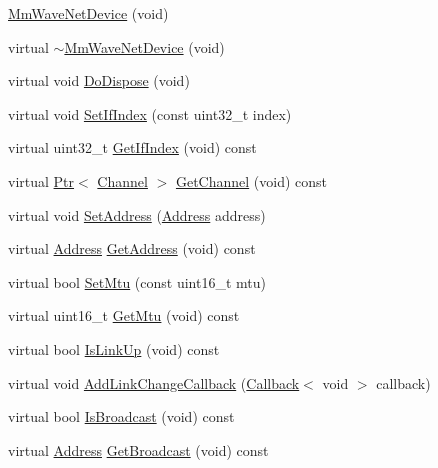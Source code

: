 \begin{DoxyCompactItemize}
\item 
\hyperlink{classns3_1_1MmWaveNetDevice_a554655d89a70a36abe6cf2cb6e44f5ce}{Mm\+Wave\+Net\+Device} (void)
\item 
virtual \hyperlink{classns3_1_1MmWaveNetDevice_a6e6a24b9b76bbb82cbf695832054f9a8}{$\sim$\+Mm\+Wave\+Net\+Device} (void)
\item 
virtual void \hyperlink{classns3_1_1MmWaveNetDevice_aabc1cc2924b3da99b6e0659ca55ae5ae}{Do\+Dispose} (void)
\item 
virtual void \hyperlink{classns3_1_1MmWaveNetDevice_a49dc45a2cf9dae3d8f32a57c1e3c4cec}{Set\+If\+Index} (const uint32\+\_\+t index)
\item 
virtual uint32\+\_\+t \hyperlink{classns3_1_1MmWaveNetDevice_af0dcd5b0dc0c6463a7f67c40cebdb30c}{Get\+If\+Index} (void) const 
\item 
virtual \hyperlink{classns3_1_1Ptr}{Ptr}$<$ \hyperlink{classns3_1_1Channel}{Channel} $>$ \hyperlink{classns3_1_1MmWaveNetDevice_a0a094fe438099aeb2f8ec46b9dabd98a}{Get\+Channel} (void) const 
\item 
virtual void \hyperlink{classns3_1_1MmWaveNetDevice_aa427e371add947c8459dacd620170062}{Set\+Address} (\hyperlink{classns3_1_1Address}{Address} address)
\item 
virtual \hyperlink{classns3_1_1Address}{Address} \hyperlink{classns3_1_1MmWaveNetDevice_a7b11eb72017ac4243c33a11ea6f60cad}{Get\+Address} (void) const 
\item 
virtual bool \hyperlink{classns3_1_1MmWaveNetDevice_aa4b40d946ed3afbd81bf5e8c3d45f8ed}{Set\+Mtu} (const uint16\+\_\+t mtu)
\item 
virtual uint16\+\_\+t \hyperlink{classns3_1_1MmWaveNetDevice_adfc5a0442aaee25f6a448cf18fada75a}{Get\+Mtu} (void) const 
\item 
virtual bool \hyperlink{classns3_1_1MmWaveNetDevice_a19fc4859de1b6ea976231e6a0cd6401b}{Is\+Link\+Up} (void) const 
\item 
virtual void \hyperlink{classns3_1_1MmWaveNetDevice_a8a5888aff25a6c1c41af6bb22df885a8}{Add\+Link\+Change\+Callback} (\hyperlink{classns3_1_1Callback}{Callback}$<$ void $>$ callback)
\item 
virtual bool \hyperlink{classns3_1_1MmWaveNetDevice_a4a880dc593a5537f70a81033e14ac315}{Is\+Broadcast} (void) const 
\item 
virtual \hyperlink{classns3_1_1Address}{Address} \hyperlink{classns3_1_1MmWaveNetDevice_a7464a25cb97ecf445940707ef86b175f}{Get\+Broadcast} (void) const 

\end{DoxyCompactItemize}
